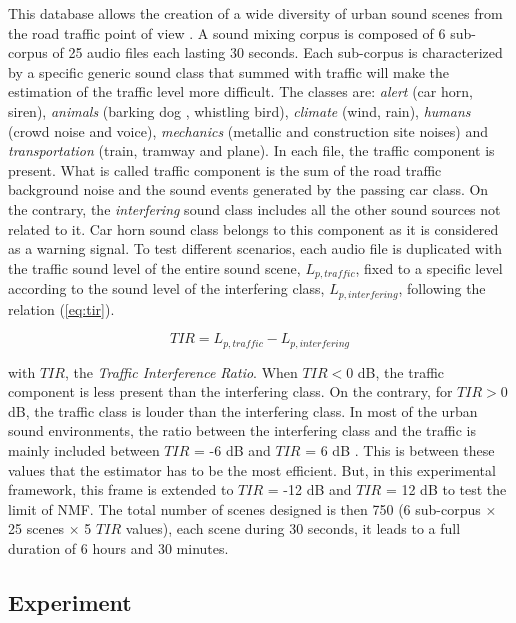 \documentclass[twocolumn]{svjour3}          %
\begin{document}
This database allows the creation of a wide diversity of urban sound scenes from the road traffic point of view \cite{gloaguen_creation_2017}. A sound mixing corpus is composed of 6 sub-corpus of 25 audio files each lasting 30 seconds. Each sub-corpus is characterized by a specific generic sound class that summed with traffic will make the estimation of the traffic level more difficult. The classes are: \textit{alert} (car horn, siren), \textit{animals} (barking dog , whistling bird), \textit{climate} (wind, rain), \textit{humans} (crowd noise and voice), \textit{mechanics} (metallic and construction site noises) and \textit{transportation} (train, tramway and plane). In each file, the traffic component is present. What is called traffic component is the sum of the road traffic background noise and the sound events generated by the passing car class. On the contrary, the \textit{interfering} sound class includes all the other sound sources not related to it. Car horn sound class belongs to this component as it is considered as a warning signal. To test different scenarios, each audio file is duplicated with the traffic sound level of the entire sound scene, $L_{p,traffic}$, fixed to a specific level according to the sound level of the interfering class, $L_{p,interfering}$,  following the relation (\ref{eq:tir}).

\begin{equation}\label{eq:tir}
TIR = L_{p,traffic}-L_{p,interfering}
\end{equation}

with $TIR$, the \textit{Traffic Interference Ratio}. When $TIR < 0$ dB, the traffic component is less present than the interfering class. On the contrary, for $TIR > 0$ dB, the traffic class is louder than the interfering class. 
In most of the urban sound environments, the ratio between the interfering class and the traffic is mainly included between $TIR$ = -6 dB and $TIR$ = 6 dB \cite{gloaguen_creation_2017}. This is between these values that the estimator has to be the most efficient. But, in this experimental framework, this frame is extended to $TIR$ = -12 dB and $TIR$ = 12 dB to test the limit of NMF. The total number of scenes designed is then 750 (6 sub-corpus $\times$ 25 scenes $\times$  5 $TIR$ values), each scene during 30 seconds, it leads to a full duration of 6 hours and 30 minutes.

\subsection{Experiment}
\end{document}
